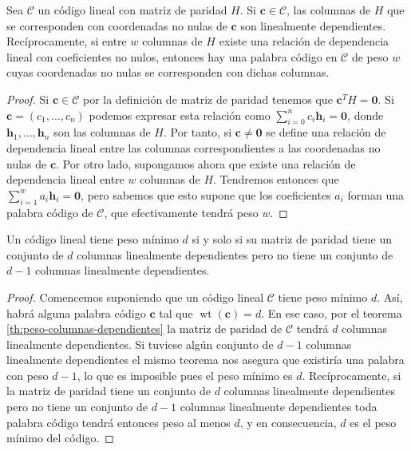 
\begin{theorem}
  Sea \(\mathcal C\) un código lineal con matriz de paridad \(H\). Si \(\mathbf{c} \in \mathcal C\), las columnas de \(H\) que se corresponden con coordenadas no nulas de \(\mathbf{c}\) son linealmente dependientes.
  Recíprocamente, si entre \(w\) columnas de \(H\) existe una relación de dependencia lineal con coeficientes no nulos, entonces hay una palabra código en \(\mathcal C\) de peso \(w\) cuyas coordenadas no nulas se corresponden con dichas columnas.
\end{theorem}

\begin{proof}
  \label{th:peso-columnas-dependientes}
  Si \(\mathbf{c} \in \mathcal C\) por la definición de matriz de paridad tenemos que \(\mathbf{c}^TH = \mathbf{0}\).
  Si \(\mathbf{c} = (c_1, \dots, c_n)\) podemos expresar esta relación como \(\sum_{i=0}^n c_i \mathbf{h}_i = \mathbf{0}\), donde \(\mathbf{h}_1, \dots, \mathbf{h}_n\) son las columnas de \(H\).
  Por tanto, si \(\mathbf{c} \neq \mathbf{0}\) se define una relación de dependencia lineal entre las columnas correspondientes a las coordenadas no nulas de \(\mathbf{c}\).
  Por otro lado, supongamos ahora que existe una relación de dependencia lineal entre \(w\) columnas de \(H\).
  Tendremos entonces que \(\sum_{i=1}^w a_i \mathbf{h}_i = \mathbf{0}\), pero sabemos que esto supone que los coeficientes \(a_i\) forman una palabra código de \(\mathcal C\), que efectivamente tendrá peso \(w\).
\end{proof}

\begin{corollary}
  \label{cor:peso-minimo-columnas-dependientes}
  Un código lineal tiene peso mínimo \(d\) si y solo si su matriz de paridad tiene un conjunto de \(d\) columnas linealmente dependientes pero no tiene un conjunto de \(d-1\) columnas linealmente dependientes.
\end{corollary}

\begin{proof}
  Comencemos suponiendo que un código lineal \(\mathcal C\) tiene peso mínimo \(d\).
  Así, habrá alguna palabra código \(\mathbf{c}\) tal que \(\operatorname{wt}(\mathbf{c}) = d\).
  En ese caso, por el teorema \ref{th:peso-columnas-dependientes} la matriz de paridad de \(\mathcal C\) tendrá \(d\) columnas linealmente dependientes.
  Si tuviese algún conjunto de \(d-1\) columnas linealmente dependientes el mismo teorema nos asegura que existiría una palabra con peso \(d-1\), lo que es imposible pues el peso mínimo es \(d\).
  Recíprocamente, si la matriz de paridad tiene un conjunto de \(d\) columnas linealmente dependientes pero no tiene un conjunto de \(d-1\) columnas linealmente dependientes toda palabra código tendrá entonces peso al menos \(d\), y en consecuencia, \(d\) es el peso mínimo del código.
\end{proof}

